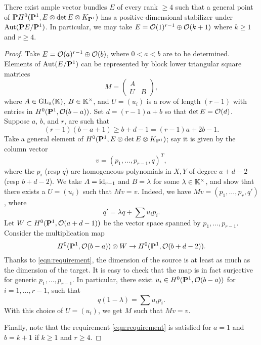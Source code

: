 \begin{proposition}\label{prop:specialE}
  There exist ample vector bundles $E$ of every rank $\geq 4$ such that a general point of $\P H^0(\P^1, E \otimes \det E \otimes K_{\P^1})$ has a positive-dimensional stabilizer under $\Aut(\P E/\P^1)$.
  In particular, we may take $E = \O(1)^{r-1} \oplus \O(k+1)$ where $k \geq 1$ and $r \geq 4$.
\end{proposition}
\begin{proof}
  Take $E = \O(a)^{r-1} \oplus \O(b)$, where $0 < a < b$ are to be determined.
  Elements of $\Aut (E/\P^1)$ can be represented by block lower triangular square matrices
  \[M = 
    \begin{pmatrix}
      A &  \\
      U & B
    \end{pmatrix},
  \]
  where $A \in \GL_a(\k)$, $B \in \k^\times$, and $U = (u_i)$ is a row of length $(r-1)$ with entries in $H^0(\P^1, \O(b-a))$.
  Set $d = (r-1)a + b$ so that $\det E = \O(d)$.
  Suppose $a$, $b$, and $r$, are such that
  \begin{equation}\label{eqn:requirement}
    (r-1) (b-a+1) \geq b+d-1 = (r-1)a+2b-1.
  \end{equation}
  Take a general element of $H^0(\P^1, E \otimes \det E \otimes K_{\P^1})$; say it is given by the column vector
  \[ v = (p_1, \dots, p_{r-1}, q)^T,\]
  where the $p_i$ (resp $q$) are homogeneous polynomials in $X, Y$ of degree $a+d-2$ (resp $b+d-2$).
  We take $A = \id_{r-1}$ and $B = \lambda$ for some $\lambda \in \k^\times$, and show that there exists a $U = (u_{i})$ such that $Mv = v$.
  Indeed, we have $Mv = (p_1, \dots, p_r, q')$, where
  \[ q' = \lambda q + \sum u_{i}p_i. \]
  Let $W \subset H^0(\P^1, \O(a+d-1))$ be the vector space spanned by $p_1, \dots, p_{r-1}$.
  Consider the multiplication map
  \[ H^0(\P^1, \O(b-a)) \otimes W \to H^0(\P^1, \O(b+d-2)).\]
  Thanks to \eqref{eqn:requirement}, the dimension of the source is at least as much as the dimension of the target.
  It is easy to check that the map is in fact surjective for generic $p_1, \dots, p_{r-1}$.
  In particular, there exist $u_i \in H^0(\P^1, \O(b-a))$ for $i = 1, \dots, r-1$, such that
  \[ q(1-\lambda) = \sum u_i p_i.\]
  With this choice of $U = (u_i)$, we get $M$ such that $Mv = v$.

  Finally, note that the requirement \eqref{eqn:requirement} is satisfied for $a = 1$ and $b = k+1$ if $k \geq 1$ and $r \geq 4$.
\end{proof}

